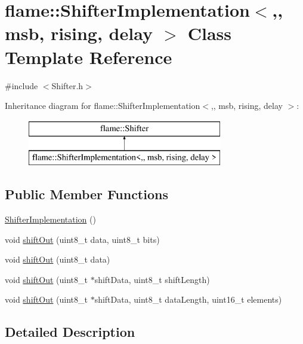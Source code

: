 \hypertarget{classflame_1_1_shifter_implementation}{\section{flame\-:\-:Shifter\-Implementation$<$,, msb, rising, delay $>$ Class Template Reference}
\label{classflame_1_1_shifter_implementation}
}


{\ttfamily \#include $<$Shifter.\-h$>$}

Inheritance diagram for flame\-:\-:Shifter\-Implementation$<$,, msb, rising, delay $>$\-:\begin{figure}[H]
\begin{center}
\leavevmode
\includegraphics[height=2.000000cm]{classflame_1_1_shifter_implementation}
\end{center}
\end{figure}
\subsection*{Public Member Functions}
\begin{DoxyCompactItemize}
\item 
\hyperlink{classflame_1_1_shifter_implementation_a6a500da4041278c3f2e773ccb86afe8d}{Shifter\-Implementation} ()
\item 
void \hyperlink{classflame_1_1_shifter_implementation_abe4372cf69fc72659d95f64f9fa3497d}{shift\-Out} (uint8\-\_\-t data, uint8\-\_\-t bits)
\item 
void \hyperlink{classflame_1_1_shifter_implementation_a927327d91cf157895c1ce236a13951a9}{shift\-Out} (uint8\-\_\-t data)
\item 
void \hyperlink{classflame_1_1_shifter_implementation_a7c061a25f9c664901f2d9247daf6f37b}{shift\-Out} (uint8\-\_\-t $\ast$shift\-Data, uint8\-\_\-t shift\-Length)
\item 
void \hyperlink{classflame_1_1_shifter_implementation_aa380a270ea9d3b40da868822daf9022e}{shift\-Out} (uint8\-\_\-t $\ast$shift\-Data, uint8\-\_\-t data\-Length, uint16\-\_\-t elements)
\end{DoxyCompactItemize}


\subsection{Detailed Description}
